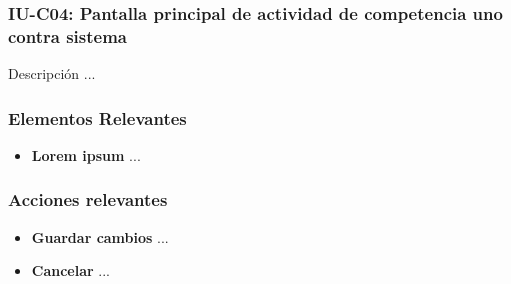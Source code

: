 
\subsubsection{IU-C04: Pantalla principal de actividad de competencia uno contra sistema}

 Descripción ...


\subsubsection{Elementos Relevantes}

    \begin{itemize}
    \item {\bf Lorem ipsum}
        ...
    \end{itemize}

\subsubsection{Acciones relevantes}

    \begin{itemize}
    \item {\bf Guardar cambios}
        ...

    \item {\bf Cancelar}
        ...
    \end{itemize}

\clearpage
